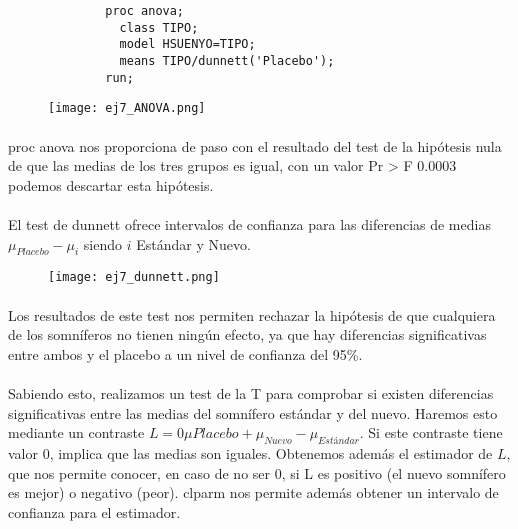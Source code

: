 \documentclass{article}
\begin{document}
    \begin{figure}[h]
			\centering
      \begin{verbatim}
        proc anova;
          class TIPO;
          model HSUENYO=TIPO;
          means TIPO/dunnett('Placebo');
        run;
      \end{verbatim}
			\label{code:sas_1}
		\end{figure}

    \begin{figure}[H]
      \centering
      \texttt{[image: ej7\_ANOVA.png]}
    \end{figure}
    \paragraph{}

    \paragraph{}
    proc anova nos proporciona de paso con el resultado del test de la hipótesis nula de que las medias de los tres grupos es igual, con un valor Pr > F 0.0003 podemos descartar esta hipótesis.

    \paragraph{}
    El test de dunnett ofrece intervalos de confianza para las diferencias de medias $\mu_{Placebo} - \mu_{i}$ siendo $i$ Estándar y Nuevo.

    \begin{figure}[H]
      \centering
      \texttt{[image: ej7\_dunnett.png]}
    \end{figure}

    \paragraph{}
    Los resultados de este test nos permiten rechazar la hipótesis de que cualquiera de los somníferos no tienen ningún efecto, ya que hay diferencias significativas entre ambos y el placebo a un nivel de confianza del 95\%.

    \paragraph{}
    Sabiendo esto, realizamos un test de la T para comprobar si existen diferencias significativas entre las medias del somnífero estándar y del nuevo. Haremos esto mediante un contraste $L=0\mu{Placebo} + \mu_{Nuevo} - \mu_{Estándar}$. Si este contraste tiene valor 0, implica que las medias son iguales. Obtenemos además el estimador de $L$, que nos permite conocer, en caso de no ser 0, si L es positivo (el nuevo somnífero es mejor) o negativo (peor). clparm nos permite además obtener un intervalo de confianza para el estimador.
\end{document}
